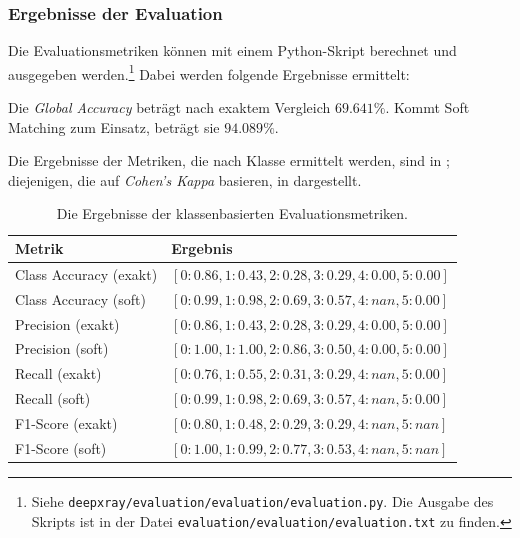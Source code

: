 \subsubsection{Ergebnisse der Evaluation}

Die Evaluationsmetriken können mit einem Python-Skript berechnet und ausgegeben werden.\footnote{Siehe \texttt{deepxray/evaluation/evaluation/evaluation.py}. Die Ausgabe des Skripts ist in der Datei \texttt{evaluation/evaluation/evaluation.txt} zu finden.} Dabei werden folgende Ergebnisse ermittelt:

Die \textit{Global Accuracy} beträgt nach exaktem Vergleich $69.641\%$. Kommt Soft Matching zum Einsatz, beträgt sie $94.089\%$.

Die Ergebnisse der Metriken, die nach Klasse ermittelt werden, sind in ; diejenigen, die auf \textit{Cohen's Kappa} basieren, in  dargestellt.

\begin{table}[tbh]
    \center
    \begin{tabular}{l|l}
        Metrik & Ergebnis \\ \hline
        Class Accuracy (exakt) & $[0: 0.86, 1: 0.43, 2: 0.28, 3: 0.29, 4: 0.00, 5: 0.00]$ \\
        Class Accuracy (soft) & $[0: 0.99, 1: 0.98, 2: 0.69, 3: 0.57, 4: nan, 5: 0.00]$ \\
        Precision (exakt) & $[0: 0.86, 1: 0.43, 2: 0.28, 3: 0.29, 4: 0.00, 5: 0.00]$ \\
        Precision (soft) & $[0: 1.00, 1: 1.00, 2: 0.86, 3: 0.50, 4: 0.00, 5: 0.00]$ \\
        Recall (exakt) & $[0: 0.76, 1: 0.55, 2: 0.31, 3: 0.29, 4: nan, 5: 0.00]$ \\
        Recall (soft) & $[0: 0.99, 1: 0.98, 2: 0.69, 3: 0.57, 4: nan, 5: 0.00]$ \\
        F1-Score (exakt) & $[0: 0.80, 1: 0.48, 2: 0.29, 3: 0.29, 4: nan, 5: nan]$ \\
        F1-Score (soft) & $[0: 1.00, 1: 0.99, 2: 0.77, 3: 0.53, 4: nan, 5: nan]$ \\
    \end{tabular}
    \caption{Die Ergebnisse der klassenbasierten Evaluationsmetriken.}
    \label{tbl:classaccuracies}
\end{table}

